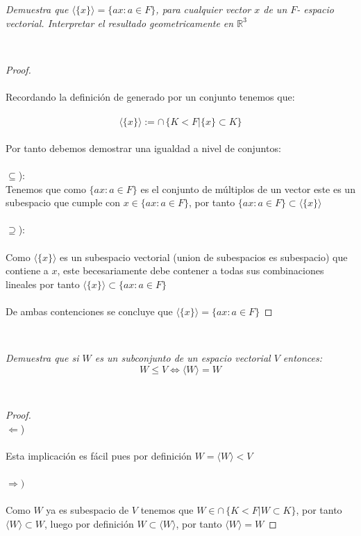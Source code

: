 \documentclass[11pt,letterpaper]{article}
\newcommand{\R}{\mathbb{R}}
\begin{document}
\begin{tcolorbox}[
	title = \textcolor{black}{\textcolor{white}{Problema 4}},]
\textit{Demuestra que $\langle\{x\}\rangle=\{ax:a\in F\}$, para cualquier vector $x$ de un $F$- espacio vectorial. Interpretar el resultado geometricamente en $\R^3$
}
\end{tcolorbox}\,\\
\begin{proof}\,\\
    \,\\
    Recordando la definici\'on de generado por un conjunto tenemos que:\,\\
    \,\\
    \begin{equation*}
       \langle\{x\}\rangle:=\cap\,\{K<F| \{x\}\subset K\}
    \end{equation*}\,\\
    Por tanto debemos demostrar una igualdad a nivel de conjuntos:\,\\
    \,\\
    $\subseteq$):\,\\
    Tenemos que como $\{ax:a\in F\}$ es el conjunto de m\'ultiplos de un vector este es 
    un subespacio que cumple con $x\in \{ax:a\in F\} $, por tanto $\{ax:a\in F\}\subset\langle\{x\}\rangle$\,\\
    \,\\
    $\supseteq$):\,\\
    \,\\
    Como $\langle\{x\}\rangle$ es un subespacio vectorial (union de subespacios es subespacio) que contiene a $x$, este becesariamente debe contener a todas
    sus combinaciones lineales por tanto $\langle\{x\}\rangle\subset\{ax:a\in F\}$\,\\
    \,\\
    De ambas contenciones se concluye que $\langle\{x\}\rangle=\{ax:a\in F\}$
\end{proof}\,\\
\newpage
\begin{tcolorbox}[
	title = \textcolor{black}{\textcolor{white}{Problema 5}},]
\textit{Demuestra que si $W$ es un subconjunto de un espacio vectorial $V$ entonces:\,\\
\begin{equation*}
    W\leq V \iff \langle W \rangle=W 
\end{equation*}
}
\end{tcolorbox}\,\\
\begin{proof}\,\\
    $\Leftarrow$)\,\\
    \,\\
    Esta implicaci\'on es f\'acil pues por definici\'on $W=\langle W \rangle<V$\,\\
    \,\\
    $\Rightarrow)$\,\\
    \,\\
    Como $W$ ya es subespacio de $V$ tenemos que $W\in\cap\,\{K<F| W\subset K\} $, por tanto $\langle W \rangle\subset W$, luego
    por definici\'on $W\subset \langle W \rangle$, por tanto $\langle W \rangle=W$
\end{proof}\,\\
\end{document}
